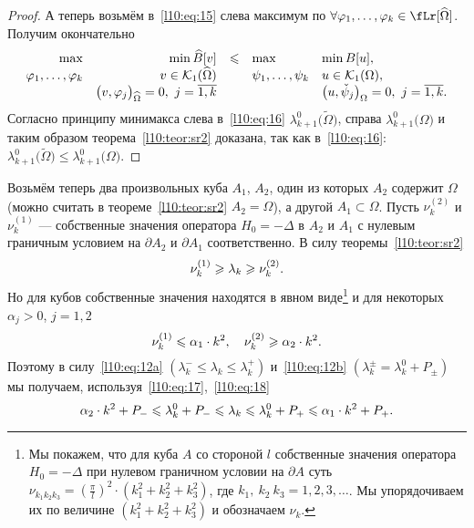 \begin{proof}
	А теперь возьмём в~\eqref{l10:eq:15} слева максимум по $\forall\phi_1,\ldots,\phi_k\in\fLr[\widehat{\Omega}]$. Получим окончательно
	\begin{equation}\label{l10:eq:16}
		\hfill\begin{array}{rrcll}
			\max&\min\widehat{B}[v]&\leqslant&\max&\min B[u],\\
			\phi_1,\ldots,\phi_k&v\in\K_1(\widehat{\Omega})&  &\psi_1,\ldots,\psi_k &u\in\K_1(\Omega),\\
			&\big(v,\phi_j\big)_{\widehat{\Omega}}=0,\ j=\overline{1,k} & &  &\big(u,\check{\psi}_j\big)_{\Omega}=0,\ j=\overline{1,k}.
		\end{array}\hfill
	\end{equation}	
	Согласно принципу минимакса слева в~\eqref{l10:eq:16} $\lambda_{k+1}^0\big(\widetilde{\Omega}\big)$, справа $\lambda_{k+1}^0\big(\Omega\big)$ и таким образом теорема~\ref{l10:teor:sr2} доказана, так как в~\eqref{l10:eq:16}: $\lambda_{k+1}^0\big(\widetilde{\Omega}\big)\leqslant\lambda_{k+1}^0\big(\Omega\big)$.  
\end{proof}

Возьмём теперь два произвольных куба $A_1$, $A_2$, один из которых $A_2$ содержит $\Omega$ (можно считать в теореме~\ref{l10:teor:sr2} $A_2=\widehat{\Omega}$), а другой $A_1\subset\Omega$. Пусть $\nu_k^{(2)}$ и $\nu_k^{(1)}$ --- собственные значения оператора $H_0=-\Delta$ в $A_2$ и $A_1$ с нулевым граничным условием на $\partial A_2$ и $\partial A_1$ соответственно. В силу теоремы~\ref{l10:teor:sr2} 
\begin{equation}\label{l10:eq:17}
	\hfill\nu_k^{(1)}\geqslant\lambda_k\geqslant\nu_k^{(2)}.\hfill	
\end{equation}
Но для кубов собственные значения находятся в явном виде\footnote{Мы покажем, что для куба $A$ со стороной $l$ собственные значения оператора $H_0=-\Delta$ при нулевом граничном условии на $\partial A$ суть $\displaystyle\nu_{k_1 k_2 k_3}=\left(\frac{\pi}{l}\right)^2\cdot\left(k_1^2+k_2^2+k_3^2\right)$, где $k_1,\ k_2\ k_3=1,2,3,\ldots$. Мы упорядочиваем их по величине $\left(k_1^2+k_2^2+k_3^2\right)$ и обозначаем $\nu_k$.} и для некоторых $\alpha_j>0$, $j=1,2$
\begin{equation}\label{l10:eq:18}
	\hfill\nu_k^{(1)}\leqslant\alpha_1\cdot k^2,\quad\nu_k^{(2)}\geqslant\alpha_2\cdot k^2.\hfill
\end{equation}
Поэтому в силу~\eqref{l10:eq:12a} $\displaystyle\left(\lambda_k^{-}\leqslant\lambda_k\leqslant\lambda_k^{+}\right)$  и~\eqref{l10:eq:12b} $\displaystyle\left(\lambda_k^{\pm}=\lambda_k^0+P_{\pm}\right)$ мы получаем, используя~\eqref{l10:eq:17},~\eqref{l10:eq:18} 
\begin{equation*}
	\hfill\alpha_2\cdot k^2+P_{-}\leqslant\lambda_k^{0}+P_{-}\leqslant\lambda_k\leqslant\lambda_k^{0}+P_{+}\leqslant\alpha_1\cdot k^2+P_{+}.\hfill
\end{equation*}

